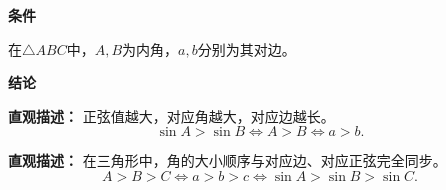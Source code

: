 \begin{statementbox}

	\textbf{\textcolor{CStatement}{条件}}
	\begin{description}[style=nextline, leftmargin=2.8em, labelsep=0.5em, itemsep=0.35em]
		\item[\textbf{\textcolor{CStatement}{条件1（适用前提）：}}] 在$\triangle ABC$中，$A,B$为内角，$a,b$分别为其对边。
	\end{description}

	\textbf{\textcolor{CStatement}{结论}}
	\begin{description}[style=nextline, leftmargin=2.8em, labelsep=0.5em, itemsep=0.45em]
		\item[\textbf{\textcolor{CStatement}{结论一（边角等价链）：}}]
			\textbf{\textcolor{CStatement}{直观描述：}}
			正弦值越大，对应角越大，对应边越长。
			\[
				\sin A > \sin B \iff A > B \iff a > b.
			\]

		\item[\textbf{\textcolor{CStatement}{推广结论（三角全序一致）：}}]
			\textbf{\textcolor{CStatement}{直观描述：}}
			在三角形中，角的大小顺序与对应边、对应正弦完全同步。
			\[
				A > B > C \iff a > b > c \iff \sin A > \sin B > \sin C.
			\]
	\end{description}

\end{statementbox}
